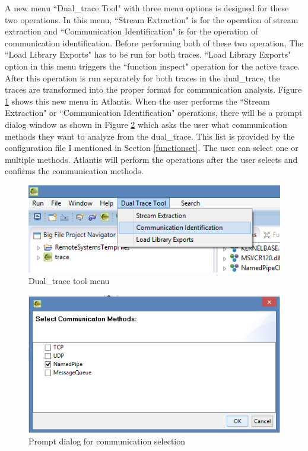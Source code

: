 \documentclass[12pt,oneside]{book}
\begin{document}
A new menu ``Dual\_trace Tool" with three menu options is designed for these two operations. In this menu, ``Stream Extraction" is for the operation of stream extraction and ``Communication Identification" is for the operation of communication identification. Before performing both of these two operation, The ``Load Library Exports" has to be run for both traces. ``Load Library Exports" option in this menu triggers the ``function inspect" operation for the active trace. After this operation is run separately for both traces in the dual\_trace, the traces are transformed into the proper format for communication analysis. Figure \ref{dualtracetoolmenu} shows this new menu in Atlantis. When the user performs the ``Stream Extraction" or ``Communication Identification" operations, there will be a prompt dialog window as shown in Figure \ref{methods} which asks the user what communication methods they want to analyze from the dual\_trace. This list is provided by the configuration file I mentioned in Section \ref{functionset}. The user can select one or multiple methods. Atlantis will perform the operations after the user selects and confirms the communication methods.

\begin{figure}[H]
\centerline{\includegraphics{Figures/dualtracetoolmenu}}
 \caption{Dual\_trace tool menu}
\label{dualtracetoolmenu}
\end{figure}

\begin{figure}[H]
\centerline{\includegraphics[scale=0.8]{Figures/methods}}
 \caption{Prompt dialog for communication selection}
\label{methods}
\end{figure}
\end{document}
